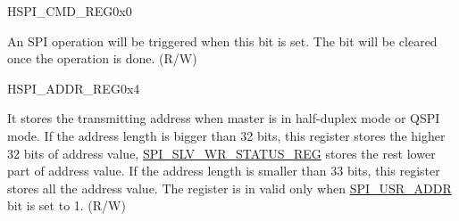 

\begin{register}{H}{SPI\_CMD\_REG}{0x0}\label{regdesc:SPICMDREG}
%
%
%
\regnewline%
\begin{regdesc}\begin{reglist}
\item [SPI\_USR] An SPI operation will be triggered when this bit is set. The bit will be cleared once the operation is done. (R/W)
\end{reglist}\end{regdesc}
\end{register}


\begin{register}{H}{SPI\_ADDR\_REG}{0x4}\label{regdesc:SPIADDRREG}
%
\regnewline%
\begin{regdesc}\begin{reglist}
\item [SPI\_ADDR\_REG]It stores the transmitting address when master is in half-duplex mode or QSPI mode. If the address length is bigger than 32 bits, this register stores the higher 32 bits of address value, \hyperref[regdesc:SPISLVWRSTATUSREG]{SPI\_SLV\_WR\_STATUS\_REG} stores the rest lower part of address value. If the address length is smaller than 33 bits,  this register stores all the address value. The register is in valid only when \hyperref[regdesc:SPIUSERREG]{SPI\_USR\_ADDR} bit is set to 1. (R/W)
\end{reglist}\end{regdesc}
\end{register}


